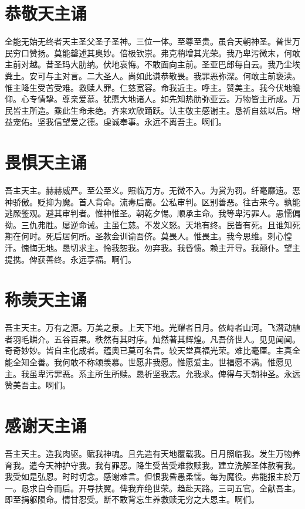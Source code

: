 \documentclass[UTF8,17pt]{ctexart}
\begin{document}
\section{恭敬天主诵}

全能⽆始⽆终者天主圣⽗圣⼦圣神。三位⼀体。⾄尊⾄贵。虽合天朝神圣。普世万民穷口赞扬。莫能罄述其奥妙。倍极钦崇。弗克稍增其光荣。我乃卑污微末，何敢主前对越。昔圣玛⼤肋纳。伏地哀悔。不敢⾯向主前。圣亚巴郎每⾃云。我乃尘埃粪⼟。安可与主对⾔。⼆⼤圣⼈。尚如此谦恭敬畏。我罪恶弥深。何敢主前亵渎。惟主降⽣受苦受难。救赎⼈罪。仁慈宽容。命我近主。呼主。赞美主。我今伏地瞻仰。⼼专情挚。尊亲爱慕。犹愿⼤地诸⼈。如先知热肋弥亚云。万物皆主所成。万民皆主所造。乘此⽣命未绝。齐来欢欣踊跃。认主敬主感谢主。恳祈⾃兹以后。增益宠佑。坚我信望爱之德。虔诚奉事。永远不离吾主。啊们。

\section{畏惧天主诵}

吾主天主。赫赫威严。⾄公⾄义。照临万⽅。⽆微不⼊。为赏为罚。纤毫靡遗。恶神骄傲。贬抑为魔。⾸⼈背命。流毒后裔。公私审判。区别善恶。往古来今。孰能逃厥鉴观。避其审判者。惟神惟圣。朝乾夕惕。顺承主命。我等卑污罪⼈。愚懦偏拗。三仇弗胜。屡逆命诫。主虽仁慈。不发义怒。天地有终。民皆有死。且谁知死期在何时。死后居何所。圣教会训谕吾侪。莫畏⼈。惟畏主。我今思维。刺⼼惶汗。愧悔⽆地。恳切求主。怜我恕我。勿弃我。我昏愦。赖主开导。我颠仆。望主提携。俾获善终。永远享福。啊们。

\section{称羡天主诵}

吾主天主。万有之源。万美之泉。上天下地。光耀者⽇⽉。依峙者⼭河。飞潜动植者⽻⽑鳞介。五⾕百果。秩然有其时序。灿然著其辉煌。凡吾侪世⼈。见见闻闻。奇奇妙妙。皆⾃主化成者。蕴奥已莫可名⾔。较天堂真福光荣。难⽐毫厘。主真全能全知全善。我何敢不称颂羡慕。世愿⾮我愿。惟愿爱主。世福愿不满。惟愿见主。我虽卑污罪恶。系主所⽣所赎。恳祈坚我志。允我求。俾得与天朝神圣。永远赞美吾主。啊们。

\section{感谢天主诵}

吾主天主。造我⾁驱。赋我神魂。且先造有天地覆载我。⽇⽉照临我。发⽣万物养育我。遣今天神护守我。我有罪恶。降⽣受苦受难救赎我。建⽴洗解圣体赦宥我。我受如是弘恩。时时切念。感谢难⾔。但恨我昏愚柔懦。每为魔役。弗能报主於万⼀。恳求⾃今⽽后。开导扶翼。俾我弃绝世荣。趋赴天路。三司五官。全献吾主。即⾄捐躯陨命。情⽢忍受。断不敢背忘⽣养救赎⽆穷之⼤恩主。啊们。
\end{document}
